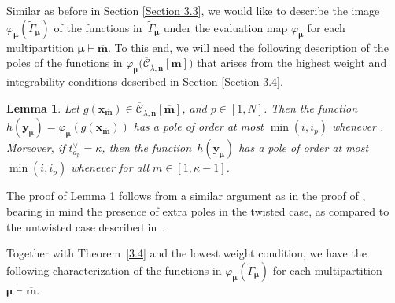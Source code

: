 \documentclass[10pt,a4paper]{amsart}
\numberwithin{equation}{section}
\newtheorem{Lemma}[Theorem]{Lemma}
\begin{document}
Similar as before in Section \ref{Section 3.3}, we would like to describe the image $\varphi_{\bm{\mu}}(\tilde{\Gamma}_{ \bm{\mu}})$ of the functions in~$\tilde{\Gamma}_{\bm{\mu}}$ under the evaluation map $\varphi_{\bm{\mu}}$ for each multipartition $\bm{\mu}\vdash\overline{\mathbf{m}}$. To this end, we will need the following description of the poles of the functions in $\varphi_{\bm{\mu}}\bigl(\overline{\mathcal{C}}_{ \overline{\lambda},\mathbf{n}}[\overline{\mathbf{m}}]\bigr)$ that arises from the highest weight and integrability conditions described in Section \ref{Section 3.4}.

\begin{Lemma}\label{3.8}
Let $g(\mathbf{x}_{\overline{\mathbf{m}}})\in \overline{ \mathcal{C}}_{\overline{\lambda},\mathbf{n}}[\overline{ \mathbf{m}}]$, and $p\in[1,N]$. Then the function $h(\mathbf{y}_{\bm{\mu}})=\varphi_{\bm{\mu}}(g(\mathbf{x}_{ \overline{ \mathbf{m}}}))$ has a pole of order at most $\min(i,i_p)$ whenever . Moreover, if $t_{a_p}^{\vee}=\kappa$, then the function~$h(\mathbf{y}_{\bm{ \mu}})$ has a pole of order at most $\min(i,i_p)$ whenever  for all $m\in[1,\kappa-1]$.
\end{Lemma}

The proof of Lemma \ref{3.8} follows from a similar argument as in the proof of \cite[Lemma 3.9]{AKS06}, bearing in mind the presence of extra poles in the twisted case, as compared to the untwisted case described in~\cite{AK07,AKS06}.

Together with Theorem~\ref{3.4} and the lowest weight condition, we have the following characterization of the functions in $\varphi_{\bm{\mu}}(\tilde{\Gamma}_{\bm{\mu}})$ for each multipartition $\bm{\mu}\vdash\overline{\mathbf{m}}$.
\end{document}
